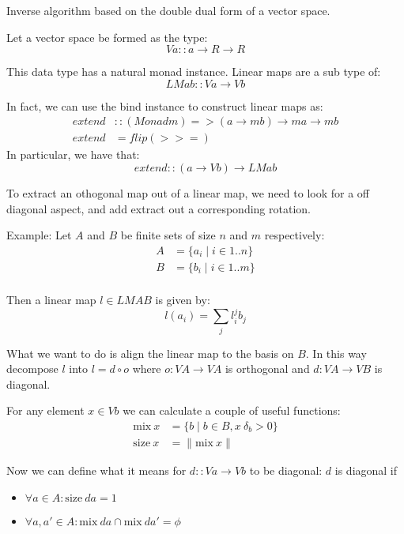 \documentclass{article}
\begin{document}
Inverse algorithm based on the double dual form of a vector space.

Let a vector space be formed as the type:
\[ V a :: a \to R \to R \]

This data type has a natural monad instance. Linear maps are a sub type of:
\[ LM a b :: V a \to V b \]

In fact, we can use the bind instance to construct linear maps as:
\begin{align*}
    extend &:: (Monad m) => (a \to m b) \to m a \to m b \\
    extend &= flip (>>=) 
\end{align*}
In particular, we have that:
\[  extend :: (a \to V b) \to LM a b \]

To extract an othogonal map out of a linear map, we need to look for a
off diagonal aspect, and add extract out a corresponding rotation. 

Example:
Let $A$ and $B$ be finite sets of size $n$ and $m$ respectively:
\begin{align*}
    A &= \{a_i \mid i \in 1 .. n \} \\
    B &= \{b_i \mid i \in 1 .. m \} \\
\end{align*}

Then a linear map $l \in LM A B$ is given by:
\[ l(a_i) = \sum_j l_i^j b_j \]

What we want to do is align the linear map to the basis on $B$. In this way
decompose $l$ into $ l = d \circ o$ where $o : V A \to V A$ is orthogonal and $d
: V A \to V B $ is diagonal.

For any element $x \in V b$ we can calculate a couple of useful functions:
\begin{align*}
   \mathrm{mix}\ x  &= \{ b \mid b \in B, x\ \delta_b > 0 \} \\
   \mathrm{size}\ x &= \| \mathrm{mix}\ x \|
\end{align*}

Now we can define what it means for $d :: V a \to V b$ to be diagonal: $d$ is diagonal if 
\begin{itemize}
    \item $\forall a \in A : \mathrm{size}\ d a = 1$
    \item $\forall a,a' \in A: \mathrm{mix}\ d a \cap \mathrm{mix}\ d a' = \phi $
\end{itemize}

  
\end{document}
